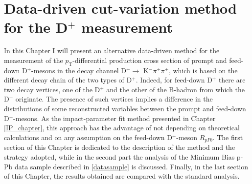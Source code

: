 \documentclass[b5paper,10pt,twoside,oldstyle,classica]{toptesi}
\newcommand{\pt}{p_\text{T}}
\begin{document}
\chapter{Data-driven cut-variation method for the D$^+$ measurement}
\label{CV_chapter}
In this Chapter I will present an alternative data-driven method for the measurement of the $\pt$-differential production cross section of prompt and feed-down D$^+$-mesons in the decay channel D$^+\rightarrow$ K$^-\pi^+\pi^+$, which is based on the different decay chain of the two types of D$^+$. Indeed, for feed-down D$^+$ there are two decay vertices, one of the D$^+$ and the other of the B-hadron from which the D$^+$ originate. The presence of such vertices implies a difference in the distributions of some reconstructed variables between the prompt and feed-down D$^+$-mesons. As the impact-parameter fit method presented in Chapter \ref{IP_chapter}, this approach has the advantage of not depending on theoretical calculations and on any assumption on the feed-down D$^+$-meson $R_{pPb}$. The first section of this Chapter is dedicated to the description of the method and the strategy adopted, while in the second part the analysis of the Minimum Bias p-Pb data sample described in \ref{datasample} is discussed. Finally, in the last section of this Chapter, the results obtained are compared with the standard analysis.  
\end{document}
